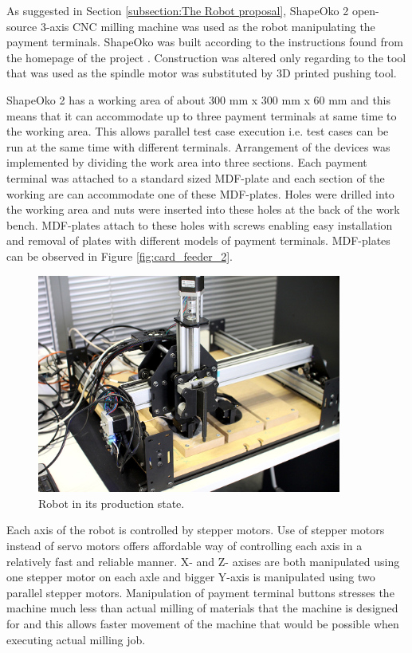 As suggested in Section \ref{subsection:The Robot proposal}, ShapeOko 2 open-source 3-axis CNC milling machine was used as the robot manipulating the payment terminals. ShapeOko was built according to the instructions found from the homepage of the project \emph{\citep{shapeoko}}. Construction was altered only regarding to the tool that was used as the spindle motor was substituted by 3D printed pushing tool.

ShapeOko 2 has a working area of about 300 mm x 300 mm x 60 mm and this means that it can accommodate up to three payment terminals at same time to the working area. This allows parallel test case execution i.e. test cases can be run at the same time with different terminals. Arrangement of the devices was implemented by dividing the work area into three sections. Each payment terminal was attached to a standard sized MDF-plate and each section of the working are can accommodate one of these MDF-plates. Holes were drilled into the working area and nuts were inserted into these holes at the back of the work bench. MDF-plates attach to these holes with screws enabling easy installation and removal of plates with different models of payment terminals. MDF-plates can be observed in Figure \ref{fig:card_feeder_2}.

\begin{figure}[ht]
  \begin{center}
    \includegraphics[width=10cm]{images/robot.jpg}
    \caption{Robot in its production state.}
    \label{fig:robot_final}
  \end{center}
\end{figure}
\FloatBarrier

Each axis of the robot is controlled by stepper motors. Use of stepper motors instead of servo motors offers affordable way of controlling each axis in a relatively fast and reliable manner. X- and Z- axises are both manipulated using one stepper motor on each axle and bigger Y-axis is manipulated using two parallel stepper motors. Manipulation of payment terminal buttons stresses the machine much less than actual milling of materials that the machine is designed for and this allows faster movement of the machine that would be possible when executing actual milling job.

